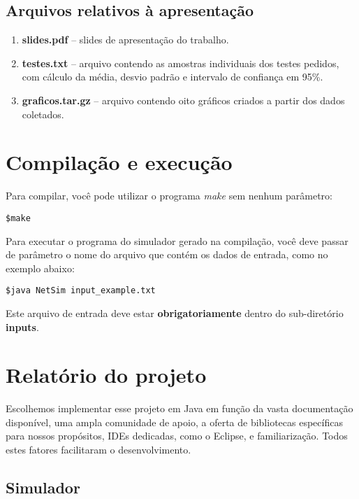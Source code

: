 \documentclass[11pt]{article}
\begin{document}
\subsection{Arquivos relativos à apresentação}
\begin{enumerate}
	\item \textbf{slides.pdf} -- slides de apresentação do trabalho.
	\item \textbf{testes.txt} -- arquivo contendo as amostras individuais dos testes pedidos, com cálculo da média, desvio padrão e intervalo de confiança em 95\%.
	\item \textbf{graficos.tar.gz} -- arquivo contendo oito gráficos criados a partir dos dados coletados.\\
\end{enumerate}

\section{Compilação e execução}
Para compilar, você pode utilizar o programa \textit{make} sem nenhum parâmetro:

\color{cyan}
\begin{verbatim}
$make
\end{verbatim}
\color{black}

\noindent Para executar o programa do simulador gerado na compilação, você deve passar de parâmetro o nome do arquivo que contém os dados de entrada, como no exemplo abaixo: 

\color{cyan}
\begin{verbatim}
$java NetSim input_example.txt
\end{verbatim}
\color{black}

\noindent Este arquivo de entrada deve estar \textbf{\textcolor{warning}{obrigatoriamente}} dentro do sub-diretório \textbf{inputs}. 

\section{Relatório do projeto}

Escolhemos implementar esse projeto em Java em função da vasta documentação disponível, uma ampla comunidade de apoio, a oferta de bibliotecas específicas para nossos propósitos, IDEs dedicadas, como o Eclipse, e familiarização. Todos estes fatores facilitaram o desenvolvimento.   

\subsection{Simulador}
\end{document}
